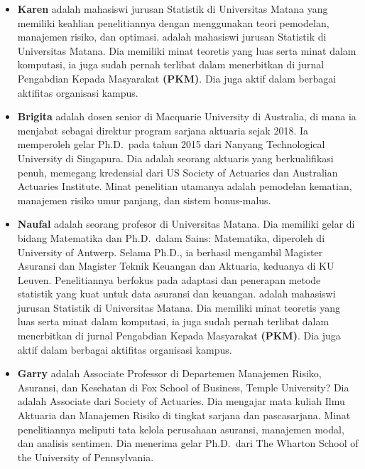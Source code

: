 \documentclass[
]{book}
\providecommand{\tightlist}{%
  \setlength{\itemsep}{0pt}\setlength{\parskip}{0pt}}
\begin{document}
\begin{itemize}
\tightlist
\item
  \textbf{Karen} adalah mahasiswi jurusan Statistik di Universitas Matana yang memiliki keahlian penelitiannya dengan menggunakan teori pemodelan, manajemen risiko, dan optimasi. adalah mahasiswi jurusan Statistik di Universitas Matana. Dia memiliki minat teoretis yang luas serta minat dalam komputasi, ia juga sudah pernah terlibat dalam menerbitkan di jurnal Pengabdian Kepada Masyarakat \textbf{(PKM)}. Dia juga aktif dalam berbagai aktifitas organisasi kampus.
\end{itemize}

\begin{itemize}
\tightlist
\item
  \textbf{Brigita} adalah dosen senior di Macquarie University di Australia, di mana ia menjabat sebagai direktur program sarjana aktuaria sejak 2018. Ia memperoleh gelar Ph.D.~pada tahun 2015 dari Nanyang Technological University di Singapura. Dia adalah seorang aktuaris yang berkualifikasi penuh, memegang kredensial dari US Society of Actuaries dan Australian Actuaries Institute. Minat penelitian utamanya adalah pemodelan kematian, manajemen risiko umur panjang, dan sistem bonus-malus.
\end{itemize}

\begin{itemize}
\tightlist
\item
  \textbf{Naufal} adalah seorang profesor di Universitas Matana. Dia memiliki gelar di bidang Matematika dan Ph.D.~dalam Sains: Matematika, diperoleh di University of Antwerp. Selama Ph.D., ia berhasil mengambil Magister Asuransi dan Magister Teknik Keuangan dan Aktuaria, keduanya di KU Leuven. Penelitiannya berfokus pada adaptasi dan penerapan metode statistik yang kuat untuk data asuransi dan keuangan. adalah mahasiswi jurusan Statistik di Universitas Matana. Dia memiliki minat teoretis yang luas serta minat dalam komputasi, ia juga sudah pernah terlibat dalam menerbitkan di jurnal Pengabdian Kepada Masyarakat \textbf{(PKM)}. Dia juga aktif dalam berbagai aktifitas organisasi kampus.
\end{itemize}

\begin{itemize}
\tightlist
\item
  \textbf{Garry} adalah Associate Professor di Departemen Manajemen Risiko, Asuransi, dan Kesehatan di Fox School of Business, Temple University? Dia adalah Associate dari Society of Actuaries. Dia mengajar mata kuliah Ilmu Aktuaria dan Manajemen Risiko di tingkat sarjana dan pascasarjana. Minat penelitiannya meliputi tata kelola perusahaan asuransi, manajemen modal, dan analisis sentimen. Dia menerima gelar Ph.D.~dari The Wharton School of the University of Pennsylvania.
\end{itemize}
\end{document}
